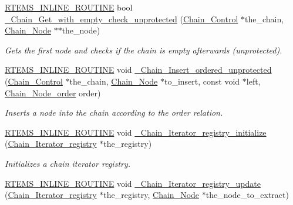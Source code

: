 \begin{DoxyCompactItemize}
\mbox{\hyperlink{group__RTEMSScoreBaseDefs_gac216239df231d5dbd15e3520b0b9313f}{R\+T\+E\+M\+S\+\_\+\+I\+N\+L\+I\+N\+E\+\_\+\+R\+O\+U\+T\+I\+NE}} bool \mbox{\hyperlink{group__RTEMSScoreChain_gaa0d69418a78fee86b718cd78a8566a91}{\+\_\+\+Chain\+\_\+\+Get\+\_\+with\+\_\+empty\+\_\+check\+\_\+unprotected}} (\mbox{\hyperlink{unionChain__Control}{Chain\+\_\+\+Control}} $\ast$the\+\_\+chain, \mbox{\hyperlink{group__RTEMSScoreChain_ga0dd4bfcca1ac7f90de2842e447846d3d}{Chain\+\_\+\+Node}} $\ast$$\ast$the\+\_\+node)
\begin{DoxyCompactList}\small\item\em Gets the first node and checks if the chain is empty afterwards (unprotected). \end{DoxyCompactList}\item 
\mbox{\hyperlink{group__RTEMSScoreBaseDefs_gac216239df231d5dbd15e3520b0b9313f}{R\+T\+E\+M\+S\+\_\+\+I\+N\+L\+I\+N\+E\+\_\+\+R\+O\+U\+T\+I\+NE}} void \mbox{\hyperlink{group__RTEMSScoreChain_ga6f5fcf3a7ec9b65a965c07b9722f6674}{\+\_\+\+Chain\+\_\+\+Insert\+\_\+ordered\+\_\+unprotected}} (\mbox{\hyperlink{unionChain__Control}{Chain\+\_\+\+Control}} $\ast$the\+\_\+chain, \mbox{\hyperlink{group__RTEMSScoreChain_ga0dd4bfcca1ac7f90de2842e447846d3d}{Chain\+\_\+\+Node}} $\ast$to\+\_\+insert, const void $\ast$left, \mbox{\hyperlink{group__RTEMSScoreChain_gae0cd0f9e8aa8b188cc3abed0fc77b9e7}{Chain\+\_\+\+Node\+\_\+order}} order)
\begin{DoxyCompactList}\small\item\em Inserts a node into the chain according to the order relation. \end{DoxyCompactList}\item 
\mbox{\hyperlink{group__RTEMSScoreBaseDefs_gac216239df231d5dbd15e3520b0b9313f}{R\+T\+E\+M\+S\+\_\+\+I\+N\+L\+I\+N\+E\+\_\+\+R\+O\+U\+T\+I\+NE}} void \mbox{\hyperlink{group__RTEMSScoreChain_gacb051f41518e411667b7551aa7b2d1b7}{\+\_\+\+Chain\+\_\+\+Iterator\+\_\+registry\+\_\+initialize}} (\mbox{\hyperlink{structChain__Iterator__registry}{Chain\+\_\+\+Iterator\+\_\+registry}} $\ast$the\+\_\+registry)
\begin{DoxyCompactList}\small\item\em Initializes a chain iterator registry. \end{DoxyCompactList}\item 
\mbox{\hyperlink{group__RTEMSScoreBaseDefs_gac216239df231d5dbd15e3520b0b9313f}{R\+T\+E\+M\+S\+\_\+\+I\+N\+L\+I\+N\+E\+\_\+\+R\+O\+U\+T\+I\+NE}} void \mbox{\hyperlink{group__RTEMSScoreChain_gab41311aebb8f4e50ff8e75516d5245e6}{\+\_\+\+Chain\+\_\+\+Iterator\+\_\+registry\+\_\+update}} (\mbox{\hyperlink{structChain__Iterator__registry}{Chain\+\_\+\+Iterator\+\_\+registry}} $\ast$the\+\_\+registry, \mbox{\hyperlink{group__RTEMSScoreChain_ga0dd4bfcca1ac7f90de2842e447846d3d}{Chain\+\_\+\+Node}} $\ast$the\+\_\+node\+\_\+to\+\_\+extract)
$$
\end{DoxyCompactItemize}
